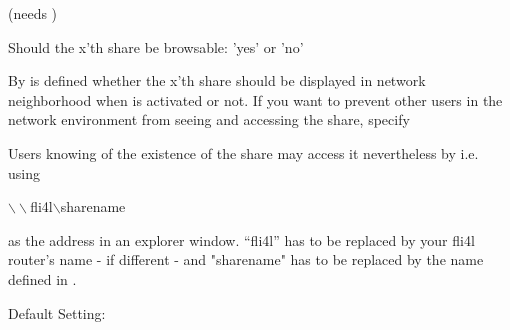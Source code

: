 \begin{description}
 (needs )

  Should the x'th share be browsable: 'yes' or 'no'

  By  is defined whether the x'th share should be
  displayed in network neighborhood when  is activated or not.
  If you want to prevent other users in the network environment from seeing
  and accessing the share, specify


  Users knowing of the existence of the share may access it nevertheless by i.e.
  using

      $\backslash\backslash$fli4l$\backslash$sharename

  as the address in an explorer window. ``fli4l'' has to be replaced by your fli4l router's
  name - if different - and "sharename" has to be replaced by the name
  defined in .

  Default Setting: 

\end{description}

